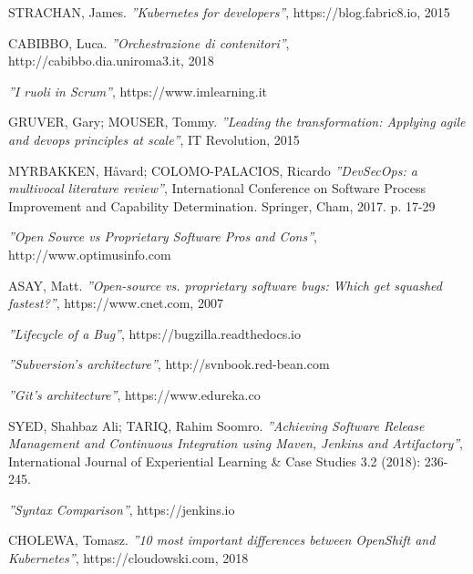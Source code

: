 \documentclass[a4paper, 12pt]{report}
\numberwithin{equation}{section}
\begin{document}
\begin{thebibliography}{9}
        STRACHAN, James.
            \emph{''Kubernetes for developers''},
            https://blog.fabric8.io, 2015
            
        CABIBBO, Luca.
            \emph{''Orchestrazione di contenitori''},
            http://cabibbo.dia.uniroma3.it, 2018
            
            \emph{''I ruoli in Scrum''},
            https://www.imlearning.it
            
        GRUVER, Gary; MOUSER, Tommy.
            \emph{''Leading the transformation: Applying agile and devops principles at scale''},
            IT Revolution, 2015
            
        MYRBAKKEN, Håvard; COLOMO-PALACIOS, Ricardo
            \emph{''DevSecOps: a multivocal literature review''},
            International Conference on Software Process Improvement and Capability Determination. Springer, Cham, 2017. p. 17-29
            
            \emph{''Open Source vs Proprietary Software Pros and Cons''},
            http://www.optimusinfo.com
            
        ASAY, Matt.
            \emph{''Open-source vs. proprietary software bugs: Which get squashed fastest?''},
            https://www.cnet.com, 2007
            
            \emph{''Lifecycle of a Bug''},
            https://bugzilla.readthedocs.io
            
            \emph{''Subversion's architecture''},
            http://svnbook.red-bean.com
            
            \emph{''Git's architecture''},
            https://www.edureka.co
            
        SYED, Shahbaz Ali; TARIQ, Rahim Soomro.
            \emph{''Achieving Software Release Management and Continuous Integration using Maven, Jenkins and Artifactory''},
            International Journal of Experiential Learning & Case Studies 3.2 (2018): 236-245.
            
            \emph{''Syntax Comparison''},
            https://jenkins.io
            
            
            
        CHOLEWA, Tomasz.
            \emph{''10 most important differences between OpenShift and Kubernetes''},
            https://cloudowski.com, 2018
        
            
            
\end{thebibliography}
\end{document}
